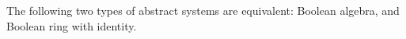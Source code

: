 The following two types of abstract systems are equivalent: Boolean algebra, and Boolean ring with identity.
